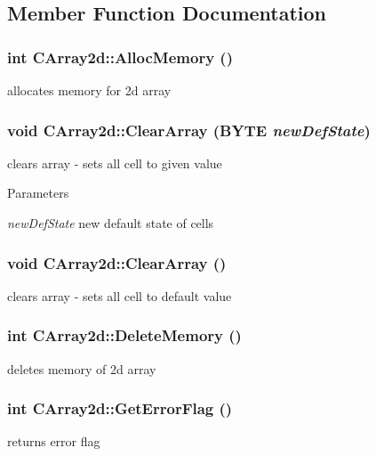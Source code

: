 \subsection{Member Function Documentation}
\hypertarget{classCArray2d_ad7566b350c9840af12641ca9385aa352}{
\subsubsection[{AllocMemory}]{\setlength{\rightskip}{0pt plus 5cm}int CArray2d::AllocMemory ()}}
\label{classCArray2d_ad7566b350c9840af12641ca9385aa352}
allocates memory for 2d array \hypertarget{classCArray2d_a7171786b38896bf4bc52261daae3dde0}{
\subsubsection[{ClearArray}]{\setlength{\rightskip}{0pt plus 5cm}void CArray2d::ClearArray (BYTE {\em newDefState})}}
\label{classCArray2d_a7171786b38896bf4bc52261daae3dde0}
clears array -\/ sets all cell to given value


\begin{DoxyParams}{Parameters}
\item[{\em newDefState}]new default state of cells \end{DoxyParams}
\hypertarget{classCArray2d_a3b4fc6d5c1536af5e6aead66ee7259eb}{
\subsubsection[{ClearArray}]{\setlength{\rightskip}{0pt plus 5cm}void CArray2d::ClearArray ()}}
\label{classCArray2d_a3b4fc6d5c1536af5e6aead66ee7259eb}
clears array -\/ sets all cell to default value \hypertarget{classCArray2d_a83f5fbefa605a6f1875d084f4f2a3600}{
\subsubsection[{DeleteMemory}]{\setlength{\rightskip}{0pt plus 5cm}int CArray2d::DeleteMemory ()}}
\label{classCArray2d_a83f5fbefa605a6f1875d084f4f2a3600}
deletes memory of 2d array \hypertarget{classCArray2d_afee234adb0190a1d8f3841f75a295e26}{
\subsubsection[{GetErrorFlag}]{\setlength{\rightskip}{0pt plus 5cm}int CArray2d::GetErrorFlag ()}}
\label{classCArray2d_afee234adb0190a1d8f3841f75a295e26}
returns error flag 

